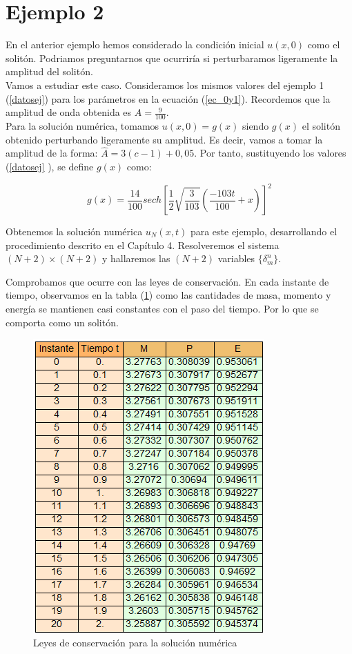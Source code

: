 \section{Ejemplo 2}

En el anterior ejemplo hemos considerado la condición inicial $u(x,0)$ como el solitón. Podriamos preguntarnos que ocurriría si perturbaramos ligeramente la amplitud del solitón.\\

Vamos a estudiar este caso. Consideramos los mismos valores del ejemplo 1 (\ref{datosej}) para los parámetros en la ecuación (\ref{ec_0y1}). Recordemos que la amplitud de onda obtenida es $A=\frac{9}{100}$.\\

Para la solución numérica, tomamos $u(x,0) = g(x)$ siendo $g(x)$ el solitón obtenido perturbando ligeramente su amplitud. Es decir, vamos a tomar la amplitud de la forma: $\hat{A}= 3(c-1) + 0,05$. Por tanto, sustituyendo los valores (\ref{datosej} ), se define $g(x)$ como:

 \begin{equation}
    g(x)=\frac{14}{100}sech\left[\frac{1}{2}\sqrt{\frac{3}{103}}\left(\frac{-103t}{100}+x\right)\right]^{2}
\end{equation}

Obtenemos la solución numérica $u_{N}(x,t)$ para este ejemplo, desarrollando el procedimiento descrito en el Capítulo 4. Resolveremos el sistema $(N+2)\times(N+2)$ y hallaremos las $(N+2)$ variables $\{\delta_{m}^{n}\}$.

Comprobamos que ocurre con las leyes de conservación. En cada instante de tiempo, observamos en la tabla (\ref{fig:LeyesConservativas1}) como las cantidades de masa, momento y energía se mantienen casi constantes con el paso del tiempo. Por lo que se comporta como un solitón.

\begin{figure}[h]
  \centering
    \includegraphics{Leyesconservativas1.png}
  \caption{Leyes de conservación para la solución numérica}
  \label{fig:LeyesConservativas1}
\end{figure}

